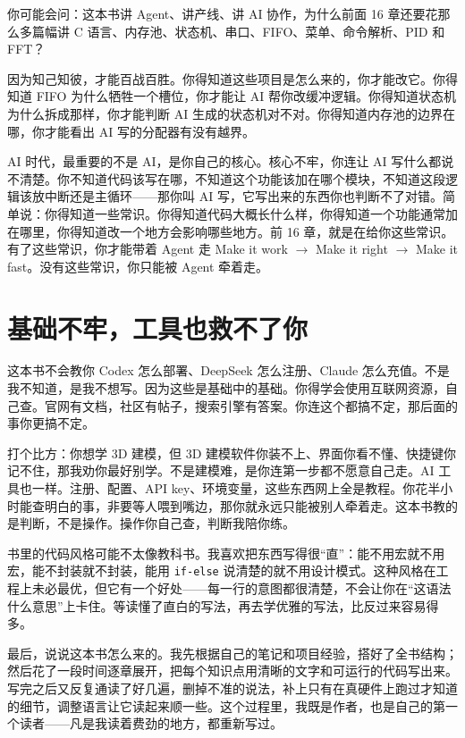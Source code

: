 你可能会问：这本书讲 Agent、讲产线、讲 AI 协作，为什么前面 16 章还要花那么多篇幅讲 C 语言、内存池、状态机、串口、FIFO、菜单、命令解析、PID 和 FFT？

因为知己知彼，才能百战百胜。你得知道这些项目是怎么来的，你才能改它。你得知道 FIFO 为什么牺牲一个槽位，你才能让 AI 帮你改缓冲逻辑。你得知道状态机为什么拆成那样，你才能判断 AI 生成的状态机对不对。你得知道内存池的边界在哪，你才能看出 AI 写的分配器有没有越界。

AI 时代，最重要的不是 AI，是你自己的核心。核心不牢，你连让 AI 写什么都说不清楚。你不知道代码该写在哪，不知道这个功能该加在哪个模块，不知道这段逻辑该放中断还是主循环——那你叫 AI 写，它写出来的东西你也判断不了对错。简单说：你得知道一些常识。你得知道代码大概长什么样，你得知道一个功能通常加在哪里，你得知道改一个地方会影响哪些地方。前 16 章，就是在给你这些常识。有了这些常识，你才能带着 Agent 走 Make it work $\rightarrow$ Make it right $\rightarrow$ Make it fast。没有这些常识，你只能被 Agent 牵着走。

\section*{基础不牢，工具也救不了你}

这本书不会教你 Codex 怎么部署、DeepSeek 怎么注册、Claude 怎么充值。不是我不知道，是我不想写。因为这些是基础中的基础。你得学会使用互联网资源，自己查。官网有文档，社区有帖子，搜索引擎有答案。你连这个都搞不定，那后面的事你更搞不定。

打个比方：你想学 3D 建模，但 3D 建模软件你装不上、界面你看不懂、快捷键你记不住，那我劝你最好别学。不是建模难，是你连第一步都不愿意自己走。AI 工具也一样。注册、配置、API key、环境变量，这些东西网上全是教程。你花半小时能查明白的事，非要等人喂到嘴边，那你就永远只能被别人牵着走。这本书教的是判断，不是操作。操作你自己查，判断我陪你练。

书里的代码风格可能不太像教科书。我喜欢把东西写得很“直”：能不用宏就不用宏，能不封装就不封装，能用 \texttt{if-else} 说清楚的就不用设计模式。这种风格在工程上未必最优，但它有一个好处——每一行的意图都很清楚，不会让你在“这语法什么意思”上卡住。等读懂了直白的写法，再去学优雅的写法，比反过来容易得多。

最后，说说这本书怎么来的。我先根据自己的笔记和项目经验，搭好了全书结构；然后花了一段时间逐章展开，把每个知识点用清晰的文字和可运行的代码写出来。写完之后又反复通读了好几遍，删掉不准的说法，补上只有在真硬件上跑过才知道的细节，调整语言让它读起来顺一些。这个过程里，我既是作者，也是自己的第一个读者——凡是我读着费劲的地方，都重新写过。

